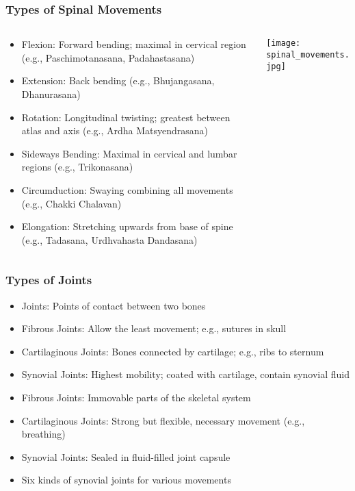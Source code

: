 \begin{frame}[fragile]\frametitle{Types of Spinal Movements}
\begin{columns}
    \begin{column}[T]{0.5\linewidth}
      \begin{itemize}
		\item Flexion: Forward bending; maximal in cervical region (e.g., Paschimotanasana, Padahastasana)
		\item Extension: Back bending (e.g., Bhujangasana, Dhanurasana)
		\item Rotation: Longitudinal twisting; greatest between atlas and axis (e.g., Ardha Matsyendrasana)
		\item Sideways Bending: Maximal in cervical and lumbar regions (e.g., Trikonasana)
		\item Circumduction: Swaying combining all movements (e.g., Chakki Chalavan)
		\item Elongation: Stretching upwards from base of spine (e.g., Tadasana, Urdhvahasta Dandasana)
	  \end{itemize}
    \end{column}
    \begin{column}[T]{0.5\linewidth}
		\begin{center}
		\texttt{[image: spinal\_movements.jpg]} 
		\end{center}	
    \end{column}
  \end{columns}
\end{frame}

\begin{frame}[fragile]\frametitle{Types of Joints}

      \begin{itemize}
		\item Joints: Points of contact between two bones
		\item Fibrous Joints: Allow the least movement; e.g., sutures in skull
		\item Cartilaginous Joints: Bones connected by cartilage; e.g., ribs to sternum
		\item Synovial Joints: Highest mobility; coated with cartilage, contain synovial fluid
		\item Fibrous Joints: Immovable parts of the skeletal system
		\item Cartilaginous Joints: Strong but flexible, necessary movement (e.g., breathing)
		\item Synovial Joints: Sealed in fluid-filled joint capsule
		\item Six kinds of synovial joints for various movements
	  \end{itemize}

\end{frame}

